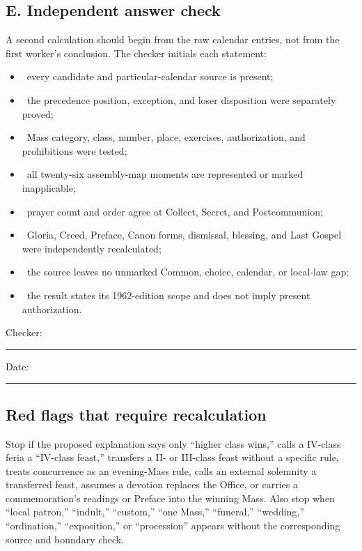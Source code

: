 \subsection{E. Independent answer check}

A second calculation should begin from the raw calendar entries, not from the first worker's conclusion.  The checker initials each statement:

\begin{itemize}
\item \checkbox\ every candidate and particular-calendar source is present;
\item \checkbox\ the precedence position, exception, and loser disposition were separately proved;
\item \checkbox\ Mass category, class, number, place, exercises, authorization, and prohibitions were tested;
\item \checkbox\ all twenty-six assembly-map moments are represented or marked inapplicable;
\item \checkbox\ prayer count and order agree at Collect, Secret, and Postcommunion;
\item \checkbox\ Gloria, Creed, Preface, Canon forms, dismissal, blessing, and Last Gospel were independently recalculated;
\item \checkbox\ the source leaves no unmarked Common, choice, calendar, or local-law gap;
\item \checkbox\ the result states its 1962-edition scope and does not imply present authorization.
\end{itemize}

Checker: \rule{0.28\linewidth}{0.4pt}\hfill Date: \rule{0.20\linewidth}{0.4pt}

\subsection{Red flags that require recalculation}

Stop if the proposed explanation says only “higher class wins,” calls a IV-class feria a “IV-class feast,” transfers a II- or III-class feast without a specific rule, treats concurrence as an evening-Mass rule, calls an external solemnity a transferred feast, assumes a devotion replaces the Office, or carries a commemoration's readings or Preface into the winning Mass.  Also stop when “local patron,” “indult,” “custom,” “one Mass,” “funeral,” “wedding,” “ordination,” “exposition,” or “procession” appears without the corresponding source and boundary check.

